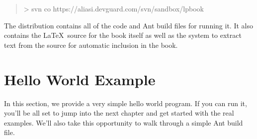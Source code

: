 \begin{quote}
{\small\ttfamily
> svn co https://aliasi.devguard.com/svn/sandbox/lpbook
}
\end{quote}
%
The distribution contains all of the code and Ant build files for
running it.  It also contains the \LaTeX\ source for the book itself
as well as the system to extract text from the source for automatic
inclusion in the book.


\section{Hello World Example}

In this section, we provide a very simple hello world program.  If you
can run it, you'll be all set to jump into the next chapter and get
started with the real examples.  We'll also take this opportunity to
walk through a simple Ant build file.













